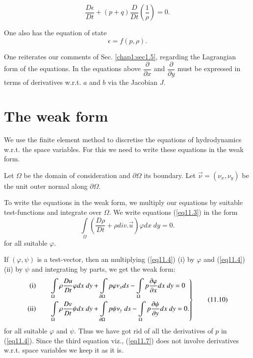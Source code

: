 \medskip
{}
\begin{equation*}
\frac{D\epsilon}{Dt} + (p+q) \frac{D}{Dt} (\frac{1}{\rho}) = 0. 
\tag{11.7}\label{eq11.7}
\end{equation*}

One also has the equation of state 
\begin{equation*}
\epsilon = f(p, \rho).\tag{11.8}\label{eq11.8}
\end{equation*}

\begin{remark}\label{chap11:rem11.1}
One reiterates our comments of Sec. \ref{chap1:sec1.5}, regarding the
Lagrangian form of the equations. In the equations above
$\dfrac{\partial}{\partial x} $ and $\dfrac{\partial}{\partial y}$
must be expressed in terms of derivatives w.r.t. $a$ and $b$ via the
Jacobian $J$.  
\end{remark}

\section{The weak form}\label{chap11:sec11.2}

We use the finite element method to discretise the equations of hydrodynamics w.r.t. the space variables. For this we need to write these equations in the weak form.

Let $\Omega$ be the domain of consideration and $\partial \Omega$ its boundary. Let $\vec{\nu} = (\nu_x, \nu_y)$ be the unit outer normal along $\partial \Omega$.

To write the equations in the weak form, we multiply our equations by suitable test-functions and integrate over $\Omega$. We write equations (\ref{eq11.3}) in the form 
\begin{equation*}
\int\limits_\Omega \left(\frac{D\rho}{Dt} + \rho div. \vec{u}\right) \varphi dx
\; dy =0. \tag{11.9}\label{eq11.9} 
\end{equation*}
for all suitable $\varphi$.

If $(\varphi, \psi)$ is a test-vector, then an multiplying
(\ref{eq11.4}) (i) by $\varphi$ and (\ref{eq11.4}) (ii) by $\psi$ and
integrating by parts, we get the weak form: 
\begin{equation*}
\left. 
\begin{aligned}
{\rm (i)} & \qquad \int\limits_\Omega \rho\frac{Du}{Dt} \varphi dx \;
dy + \int\limits_{\partial \Omega} p \varphi \nu_x ds -
\int\limits_\Omega p \frac{\partial \varphi}{\partial x} dx \; dy =
0\\ 
{\rm (ii)} & \qquad \int\limits_\Omega \rho \frac{Dv}{Dt} \psi dx \;
dy + \int\limits_{\partial\Omega} p \psi \nu_y \; ds -
\int\limits_\Omega p \frac{\partial \psi}{\partial y} dx \; dy = 0.\\ 
\end{aligned}
\right\}
\tag{11.10}\label{eq11.10}
\end{equation*}\pageoriginale 
for all suitable $\varphi$ and $\psi$. Thus we have got rid of all the derivatives of $p$ in (\ref{eq11.4}). Since the third equation viz., (\ref{eq11.7}) does not involve derivatives w.r.t. space variables we keep it as it is.

